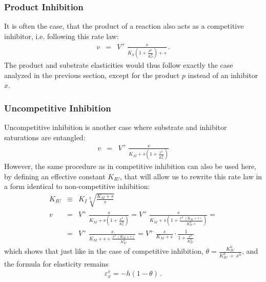 \documentclass[12pt,a4paper]{article}
\begin{document}
\subsubsection{Product Inhibition}
It is often the case, that the product of a reaction also acts as a competitive inhibitor, i.e. following this rate law:
\begin{eqnarray}
v &=& V^+ ~ \frac{s}{K_S \left(1 + \frac{p^h}{K_P^h}\right) + s}\,.
\end{eqnarray}
The product and substrate elasticities would thus follow exactly the case analyzed in the previous section, except for the product $p$ instead of an inhibitor $x$.

\subsubsection{Uncompetitive Inhibition}
Uncompetitive inhibition is another case where substrate and inhibitor saturations are entangled:
\begin{eqnarray}
    v &=& V^+ ~ \frac{s}{K_M + s \left(1 + \frac{x^h}{K_I^h}\right)}
\end{eqnarray}
However, the same procedure as in competitive inhibition can also be used here, by defining an effective constant $K_{IU}$, that will allow us to rewrite this rate law in a form identical to non-competitive inhibition:
\begin{eqnarray}
    K_{IU} &\equiv& K_I \sqrt[h]{\frac{K_M + s}{s}} \nonumber\\
    v &=& V^+ ~ \frac{s}{K_M + s \left(1 + \frac{x^h}{K_I^h}\right)} =
          V^+ ~ \frac{s}{K_M + s \left(1 + \frac{x^h~(K_M + s)}{K_{IU}^h~s}\right)} = \nonumber\\
      &=& V^+ ~ \frac{s}{K_M + s + \frac{x^h~(K_M + s)}{K_{IU}^h}} = 
          V^+ ~ \frac{s}{K_M + s} \cdot \frac{1}{1 + \frac{x^h}{K_{IU}^h}}
\end{eqnarray}
which shows that just like in the case of competitive inhibition, $\theta = \frac{K_{IU}^h}{K_{IU}^h~+~x^h}$, and the formula for elasticity remains
\begin{eqnarray}
    \varepsilon_x^v = -h(1 - \theta)\,. \label{eq:eps_uncomp_inh}
\end{eqnarray}
\end{document}
